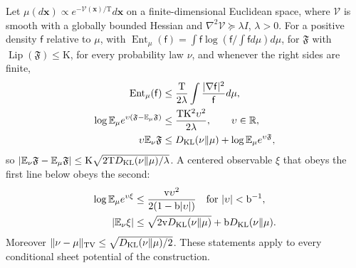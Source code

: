 Let \(\mu(d\mathbf x)\propto e^{-\mathcal V(\mathbf x)/\mathrm T}d\mathbf x\) on
a finite-dimensional Euclidean space, where \(\mathcal V\) is smooth with a
globally bounded Hessian and \(\nabla^2\mathcal V\succeq\lambda I\),
\(\lambda>0\). For a positive density \(\mathsf f\) relative to \(\mu\), with
\(\operatorname{Ent}_\mu(\mathsf f)=\int\mathsf f\log(\mathsf f/\int\mathsf f d\mu) d\mu\),
for \(\mathfrak F\) with \(\operatorname{Lip}(\mathfrak F)\le\mathrm K\), for
every probability law \(\nu\), and whenever the right sides are finite,
\begin{align}
 \operatorname{Ent}_\mu(\mathsf f)
 &\le \frac{\mathrm T}{2\lambda}
           \int\frac{|\nabla\mathsf f|^2}{\mathsf f} d\mu,
 \label{eq:rg-formation-continuous-lsi}\\
 \log\mathbb E_\mu e^{\upsilon(\mathfrak F-\mathbb E_\mu\mathfrak F)}
 &\le\frac{\mathrm T\mathrm K^2\upsilon^2}{2\lambda},
 \qquad \upsilon\in\mathbb R,
 \label{eq:rg-formation-herbst-proof}\\
 \upsilon\mathbb E_\nu\mathfrak F&\le D_{\mathrm{KL}}(\nu\Vert\mu)+\log\mathbb E_\mu e^{\upsilon\mathfrak F},
 \label{eq:rg-formation-entropy-duality}
\end{align}
so \(|\mathbb E_\nu\mathfrak F-\mathbb E_\mu\mathfrak F|\le\mathrm K\sqrt{2\mathrm TD_{\mathrm{KL}}(\nu\Vert\mu)/\lambda}\).
A centered observable \(\xi\) that obeys the first line below obeys the second:
\begin{align}
 \log\mathbb E_\mu e^{\upsilon\xi}&\le
       \frac{\mathrm v\upsilon^2}{2(1-\mathrm b|\upsilon|)}\quad\text{for } |\upsilon|<\mathrm b^{-1},
 \label{eq:rg-formation-subgamma-proof}\\
 |\mathbb E_\nu\xi|
 &\le\sqrt{2\mathrm vD_{\mathrm{KL}}(\nu\Vert\mu)}+\mathrm bD_{\mathrm{KL}}(\nu\Vert\mu).
 \label{eq:rg-formation-score-duality}
\end{align}
Moreover \(\|\nu-\mu\|_{\mathrm{TV}}\le\sqrt{D_{\mathrm{KL}}(\nu\Vert\mu)/2}\). These
statements apply to every conditional sheet potential of the construction.

